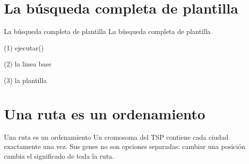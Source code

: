 \section{La búsqueda completa de plantilla}

\begin{frame}{La búsqueda completa de plantilla}
La búsqueda completa de plantilla
\end{frame}

\begin{frame}[fragile]{(1) ejecutar()}

\end{frame}

\begin{frame}[fragile]{(2) la linea base}

\end{frame}

\begin{frame}[fragile]{(3) la plantilla}

\end{frame}


\section{Una ruta es un ordenamiento}

\begin{frame}{Una ruta es un ordenamiento}
Un cromosoma del TSP contiene cada ciudad exactamente una vez. Sus genes no son opciones separadas: cambiar una posición cambia el significado de toda la ruta.
\end{frame}


